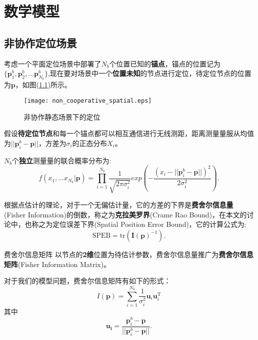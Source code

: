 \chapter{数学模型}\label{cha:model}
\section[非协作定位场景]{非协作定位场景}\label{section:noncooperative_localization}

        考虑一个平面定位场景中部署了$N_b$个位置已知的\textbf{锚点}，锚点的位置记为$\{\bm{p}^b_1,\bm{p}^b_2,...\bm{p}^b_{N_b}\}$,现在要对场景中一个\textbf{位置未知}的节点进行定位，待定位节点的位置为$\bm{p}$，如图(\ref{fig:non_cooperative_spatial})所示。
        \begin{figure}
          \centering
        \texttt{[image: non\_cooperative\_spatial.eps]}
          \caption{非协作静态场景下的定位}\label{fig:non_cooperative_spatial}
        \end{figure}
假设\textbf{待定位节点}和每一个锚点都可以相互通信进行无线测距，距离测量量服从均值为$||\bm{p}^b_i-\bm{p}||$，方差为$\sigma_i$的正态分布$X_i$。

$N_b$个\textbf{独立}测量量的联合概率分布为:
\begin{equation}\label{eq:single}
f(x_1,...x_{N_b}|\textbf{p})=\prod_{i=1}^{N_b}\frac{1}{\sqrt{2\pi\sigma_i^2}}exp\left(-\frac{(x_i-||\bm{p}^b_i-\bm{p}||)^2}{2\sigma_i^2}\right).
\end{equation}

根据点估计的理论，对于一个无偏估计量，它的方差的下界是\textbf{费舍尔信息量}(Fisher Information)的倒数，称之为\textbf{克拉美罗界}(Crame Rao Bound)，在本文的讨论中，也称之为定位误差下界(Spatial Position Error Bound)，它的计算公式为:
\begin{equation}\label{eq:SPEB_formula}
  \text{SPEB}=\text{tr}(\bm{I(\bm{p})}^{-1}).
\end{equation}


{费舍尔信息矩阵}
以节点的\textbf{2维}位置为待估计参数，费舍尔信息量推广为\textbf{费舍尔信息矩阵}(Fisher Information Matrix)。

对于我们的模型问题，费舍尔信息矩阵有如下的形式：
\begin{equation}\label{eq:uu}
I(\bm{p})=\displaystyle\sum_{i=1}^{N_b}\frac{1}{\sigma_i^2}\bm{u}_i\bm{u}_i^{\textrm{T}}
\end{equation}
其中
\begin{equation}
\bm{u_i}=\frac{\bm{p}^b_i-\bm{p}}{||\bm{p}^b_i-\bm{p}||}.
\end{equation}


